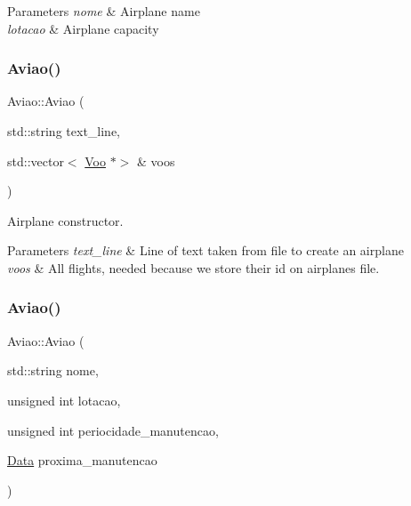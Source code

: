 \begin{DoxyParams}{Parameters}
{\em nome} & Airplane name \\
\hline
{\em lotacao} & Airplane capacity \\
\hline
\end{DoxyParams}
\mbox{\label{class_aviao_ace2bc92f2db79df73da0d48f3edd39bb}} 
\subsubsection{\texorpdfstring{Aviao()}{Aviao()}\hspace{0.1cm}{\footnotesize\ttfamily [3/4]}}
{\footnotesize\ttfamily Aviao\+::\+Aviao (\begin{DoxyParamCaption}\item[{std\+::string}]{text\+\_\+line,  }\item[{std\+::vector$<$ \hyperlink{class_voo}{Voo} $\ast$$>$ \&}]{voos }\end{DoxyParamCaption})}



Airplane constructor. 


\begin{DoxyParams}{Parameters}
{\em text\+\_\+line} & Line of text taken from file to create an airplane \\
\hline
{\em voos} & All flights, needed because we store their id on airplanes file. \\
\hline
\end{DoxyParams}
\mbox{\label{class_aviao_ad9a01dede3dd1274a63686529d44a4b7}} 
\subsubsection{\texorpdfstring{Aviao()}{Aviao()}\hspace{0.1cm}{\footnotesize\ttfamily [4/4]}}
{\footnotesize\ttfamily Aviao\+::\+Aviao (\begin{DoxyParamCaption}\item[{std\+::string}]{nome,  }\item[{unsigned int}]{lotacao,  }\item[{unsigned int}]{periocidade\+\_\+manutencao,  }\item[{\hyperlink{class_data}{Data}}]{proxima\+\_\+manutencao }\end{DoxyParamCaption})}




